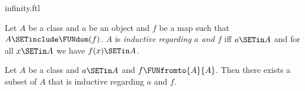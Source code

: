 \documentclass{naproche-library}
\begin{document}
\begin{smodule}[title=The Infinity Axiom]{infinity.ftl}

\begin{definition}[forthel,id=FOUNDATIONS_10_298374925738210]
  Let $A$ be a class and $a$ be an object and $f$ be a map such that $A \SETinclude \FUNdom(f)$.
  $A$ is \emph{inductive regarding $a$ and $f$} iff $a \SETin A$ and for all $x \SETin A$ we have $f(x) \SETin A$.
\end{definition}

\begin{axiom}[forthel,title=Infinity Axiom,id=FOUNDATIONS_10_367388832825344]
  Let $A$ be a class and $a \SETin A$ and $f \FUNfromto{A}{A}$.
  Then there exists a subset of $A$ that is inductive regarding $a$ and $f$.
\end{axiom}
\end{smodule}
\end{document}
